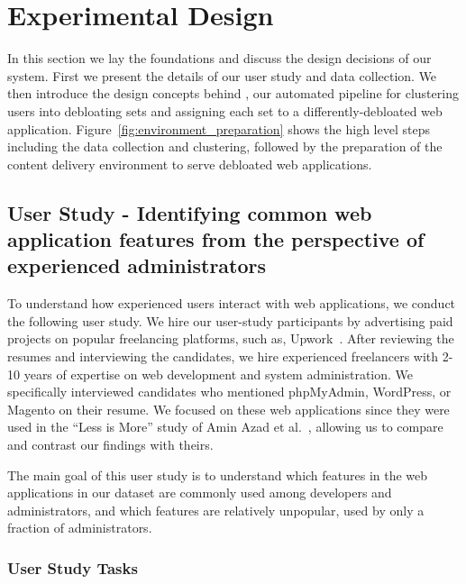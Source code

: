 \section{Experimental Design}

In this section we lay the foundations and discuss the design decisions of our system. 
First we present the details of our user study and data collection. 
We then introduce the design concepts behind \sys{}, our automated pipeline for clustering users into debloating sets and assigning each set to a differently-debloated web application.
Figure~\ref{fig:environment_preparation} shows the high level steps including the data collection and clustering, followed by the preparation of the content delivery environment to serve debloated web applications.

\subsection{User Study - Identifying common web application features from the perspective of experienced administrators}

To understand how experienced users interact with web applications, we conduct the following user study. 
We hire our user-study participants by advertising paid projects on popular freelancing platforms, such as, Upwork~\cite{upwork}. 
After reviewing the resumes and interviewing the candidates, we hire experienced freelancers with 2-10 years of expertise on web development and system administration. 
We specifically interviewed candidates who mentioned phpMyAdmin, WordPress, or Magento on their resume. We focused on these web applications since they were used in the ``Less is More'' study of Amin Azad et al.~\cite{lessismore}, allowing us to compare and contrast our findings with theirs. 

The main goal of this user study is to understand which features in the web applications in our dataset are commonly used among developers and administrators, and which features are relatively unpopular, used by only a fraction of administrators.

\subsubsection{User Study Tasks}

